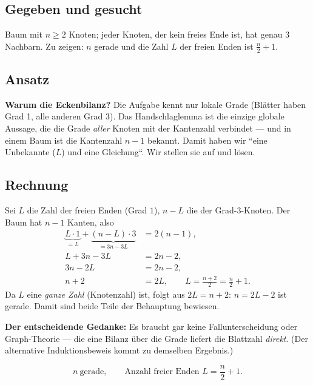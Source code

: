 

\subsection*{Gegeben und gesucht}
Baum mit $n\ge2$ Knoten; jeder Knoten, der kein freies Ende ist, hat genau
$3$ Nachbarn. Zu zeigen: $n$ gerade und die Zahl $L$ der freien Enden ist
$\tfrac n2+1$.

\subsection*{Ansatz}
\textbf{Warum die Eckenbilanz?} Die Aufgabe kennt nur lokale Grade
(Blätter haben Grad 1, alle anderen Grad 3). Das Handschlaglemma ist die
einzige globale Aussage, die die Grade \emph{aller} Knoten mit der
Kantenzahl verbindet --- und in einem Baum ist die Kantenzahl $n-1$
bekannt. Damit haben wir ``eine Unbekannte ($L$) und eine Gleichung``.
Wir stellen sie auf und lösen.

\subsection*{Rechnung}
Sei $L$ die Zahl der freien Enden (Grad $1$), $n-L$ die der Grad-3-Knoten.
Der Baum hat $n-1$ Kanten, also
\begin{align}
  \underbrace{L\cdot1}_{=L} + \underbrace{(n-L)\cdot3}_{=3n-3L} &= 2(n-1), \\
  L+3n-3L &= 2n-2, \\
  3n-2L &= 2n-2, \\
  n+2 &= 2L,
  \qquad L=\frac{n+2}2=\frac n2+1 .
\end{align}
Da $L$ eine \emph{ganze Zahl} (Knotenzahl) ist, folgt aus $2L=n+2$:
$n=2L-2$ ist gerade. Damit sind beide Teile der Behauptung bewiesen.

\textbf{Der entscheidende Gedanke:} Es braucht gar keine Fallunterscheidung
oder Graph-Theorie --- die eine Bilanz über die Grade liefert die
Blattzahl \emph{direkt}. (Der alternative Induktionsbeweis kommt zu
demselben Ergebnis.)

\begin{ergebnis}
\begin{equation*}
  n\ \text{gerade},\qquad \text{Anzahl freier Enden } L=\frac n2+1 .
\end{equation*}
\end{ergebnis}

